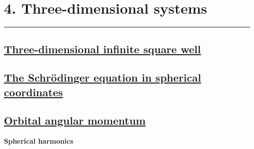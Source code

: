 \section{4. Three-dimensional systems} \hrule height 0.3pt \thinspace

\subsection{\underline{Three-dimensional infinite square well}}

\subsection{\underline{The Schr\"odinger equation in spherical coordinates}}

\subsection{\underline{Orbital angular momentum}}

\textbf{Spherical harmonics}




